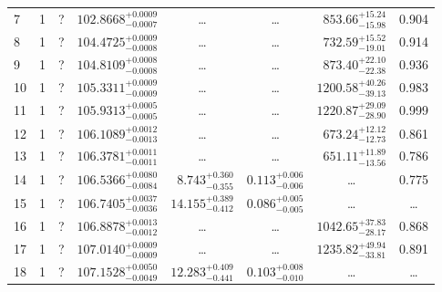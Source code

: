 \begin{table*}[!]
\begin{tabular}{llcrrlrc}
7 & 1 & ? & $    102.8668_{-      0.0007}^{+      0.0009}$ & \multicolumn{1}{c}{\dots} & \multicolumn{1}{c}{\dots} & $      853.66_{-       15.98}^{+       15.24}$ & 0.904\\[1pt]
8 & 1 & ? & $    104.4725_{-      0.0008}^{+      0.0009}$ & \multicolumn{1}{c}{\dots} & \multicolumn{1}{c}{\dots} & $      732.59_{-       19.01}^{+       15.52}$ & 0.914\\[1pt]
9 & 1 & ? & $    104.8109_{-      0.0008}^{+      0.0008}$ & \multicolumn{1}{c}{\dots} & \multicolumn{1}{c}{\dots} & $      873.40_{-       22.38}^{+       22.10}$ & 0.936\\[1pt]
10 & 1 & ? & $    105.3311_{-      0.0009}^{+      0.0009}$ & \multicolumn{1}{c}{\dots} & \multicolumn{1}{c}{\dots} & $     1200.58_{-       39.13}^{+       40.26}$ & 0.983\\[1pt]
11 & 1 & ? & $    105.9313_{-      0.0005}^{+      0.0005}$ & \multicolumn{1}{c}{\dots} & \multicolumn{1}{c}{\dots} & $     1220.87_{-       28.90}^{+       29.09}$ & 0.999\\[1pt]
12 & 1 & ? & $    106.1089_{-      0.0013}^{+      0.0012}$ & \multicolumn{1}{c}{\dots} & \multicolumn{1}{c}{\dots} & $      673.24_{-       12.73}^{+       12.12}$ & 0.861\\[1pt]
13 & 1 & ? & $    106.3781_{-      0.0011}^{+      0.0011}$ & \multicolumn{1}{c}{\dots} & \multicolumn{1}{c}{\dots} & $      651.11_{-       13.56}^{+       11.89}$ & 0.786\\[1pt]
14 & 1 & ? & $    106.5366_{-      0.0084}^{+      0.0080}$ & $       8.743_{-       0.355}^{+       0.360}$ & $       0.113_{-       0.006}^{+       0.006}$ & \multicolumn{1}{c}{\dots} & 0.775\\[1pt]
15 & 1 & ? & $    106.7405_{-      0.0036}^{+      0.0037}$ & $      14.155_{-       0.412}^{+       0.389}$ & $       0.086_{-       0.005}^{+       0.005}$ & \multicolumn{1}{c}{\dots} & \dots\\[1pt] 
16 & 1 & ? & $    106.8878_{-      0.0012}^{+      0.0013}$ & \multicolumn{1}{c}{\dots} & \multicolumn{1}{c}{\dots} & $     1042.65_{-       28.17}^{+       37.83}$ & 0.868\\[1pt]
17 & 1 & ? & $    107.0140_{-      0.0009}^{+      0.0009}$ & \multicolumn{1}{c}{\dots} & \multicolumn{1}{c}{\dots} & $     1235.82_{-       33.81}^{+       49.94}$ & 0.891\\[1pt]
18 & 1 & ? & $    107.1528_{-      0.0049}^{+      0.0050}$ & $      12.283_{-       0.441}^{+       0.409}$ & $       0.103_{-       0.010}^{+       0.008}$ & \multicolumn{1}{c}{\dots} & \dots \\[1pt]

\end{tabular}
\end{table*}
